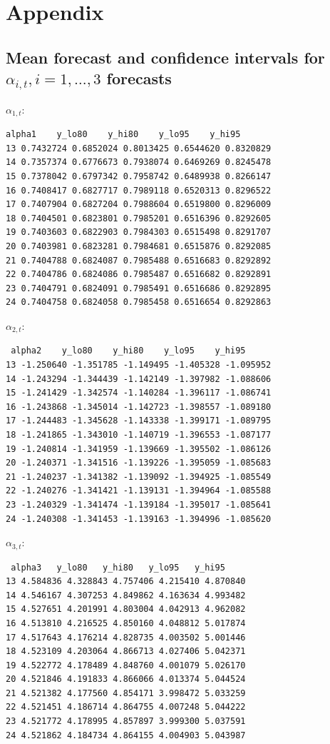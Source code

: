\newpage

\nocite{dutang2015}
\nocite{wickham2016ggplot2}


\section{Appendix}

\subsection{Mean forecast and confidence intervals for $\alpha_{i, t}, i = 1, \ldots, 3$ forecasts}

$\alpha_{1, t}$:

\begin{verbatim}
alpha1    y_lo80    y_hi80    y_lo95    y_hi95
13 0.7432724 0.6852024 0.8013425 0.6544620 0.8320829
14 0.7357374 0.6776673 0.7938074 0.6469269 0.8245478
15 0.7378042 0.6797342 0.7958742 0.6489938 0.8266147
16 0.7408417 0.6827717 0.7989118 0.6520313 0.8296522
17 0.7407904 0.6827204 0.7988604 0.6519800 0.8296009
18 0.7404501 0.6823801 0.7985201 0.6516396 0.8292605
19 0.7403603 0.6822903 0.7984303 0.6515498 0.8291707
20 0.7403981 0.6823281 0.7984681 0.6515876 0.8292085
21 0.7404788 0.6824087 0.7985488 0.6516683 0.8292892
22 0.7404786 0.6824086 0.7985487 0.6516682 0.8292891
23 0.7404791 0.6824091 0.7985491 0.6516686 0.8292895
24 0.7404758 0.6824058 0.7985458 0.6516654 0.8292863
\end{verbatim}

$\alpha_{2, t}$:

\begin{verbatim}
 alpha2    y_lo80    y_hi80    y_lo95    y_hi95
13 -1.250640 -1.351785 -1.149495 -1.405328 -1.095952
14 -1.243294 -1.344439 -1.142149 -1.397982 -1.088606
15 -1.241429 -1.342574 -1.140284 -1.396117 -1.086741
16 -1.243868 -1.345014 -1.142723 -1.398557 -1.089180
17 -1.244483 -1.345628 -1.143338 -1.399171 -1.089795
18 -1.241865 -1.343010 -1.140719 -1.396553 -1.087177
19 -1.240814 -1.341959 -1.139669 -1.395502 -1.086126
20 -1.240371 -1.341516 -1.139226 -1.395059 -1.085683
21 -1.240237 -1.341382 -1.139092 -1.394925 -1.085549
22 -1.240276 -1.341421 -1.139131 -1.394964 -1.085588
23 -1.240329 -1.341474 -1.139184 -1.395017 -1.085641
24 -1.240308 -1.341453 -1.139163 -1.394996 -1.085620
\end{verbatim}

$\alpha_{3, t}$:

\begin{verbatim}
 alpha3   y_lo80   y_hi80   y_lo95   y_hi95
13 4.584836 4.328843 4.757406 4.215410 4.870840
14 4.546167 4.307253 4.849862 4.163634 4.993482
15 4.527651 4.201991 4.803004 4.042913 4.962082
16 4.513810 4.216525 4.850160 4.048812 5.017874
17 4.517643 4.176214 4.828735 4.003502 5.001446
18 4.523109 4.203064 4.866713 4.027406 5.042371
19 4.522772 4.178489 4.848760 4.001079 5.026170
20 4.521846 4.191833 4.866066 4.013374 5.044524
21 4.521382 4.177560 4.854171 3.998472 5.033259
22 4.521451 4.186714 4.864755 4.007248 5.044222
23 4.521772 4.178995 4.857897 3.999300 5.037591
24 4.521862 4.184734 4.864155 4.004903 5.043987
\end{verbatim}

